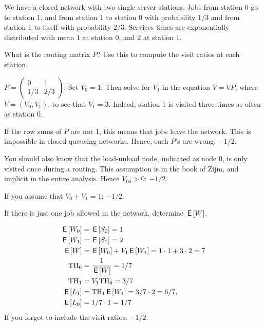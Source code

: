 We have a closed network with two single-server stations. Jobs from station 0 go to station 1, and from station 1 to station 0 with probability 1/3 and from station 1 to itself with probability $2/3$.  Services times are exponentially distributed with mean $1$ at station $0$, and $2$ at station 1.

\begin{exercise}[201804]
What is the routing matrix $P$? Use this to compute the visit ratios at each station.
\begin{solution}
  $P=
  \begin{pmatrix}
    0 & 1 \\
1/3 & 2/3
  \end{pmatrix}
$. Set $V_0=1$. Then solve for $V_1$ in the equation $V = VP$, where $V=(V_0, V_1)$, to see that $V_1=3$. Indeed, station 1 is visited three times as often as station 0. 

If the row sums of $P$ are not 1, this means that jobs leave the network. This is impossible in closed queueing networks. Hence, such $P$'s are wrong. $-1/2$.

You should also know that the load-unload node, indicated as node 0, is only visited once during a routing. This assumption is in the book of Zijm, and implicit in the entire analysis. Hence $V_{00}>0$: $-1/2$.

If you assume that $V_0+V_1=1$: $-1/2$. 

\end{solution}
\end{exercise}

\begin{exercise}[201804]
  If there is just one job allowed in the network, determine $\,\mathsf{E}\left[W\right]$.
\begin{solution}
    \begin{align*}
    \,\mathsf{E}\left[W_0\right] &= \,\mathsf{E}\left[S_0\right] = 1\\      
    \,\mathsf{E}\left[W_1\right] &= \,\mathsf{E}\left[S_1\right] = 2\\
\,\mathsf{E}\left[W\right] &= \,\mathsf{E}\left[W_0\right] + V_1 \,\mathsf{E}\left[W_1\right] = 1\cdot 1 + 3 \cdot 2 = 7\\
\mathrm{TH}_0 &= \frac{1}{\,\mathsf{E}\left[W\right]} = 1/7\\
\mathrm{TH}_1&= V_1 \mathrm{TH}_0 = 3/7\\
\,\mathsf{E}\left[L_1\right] &= \mathrm{TH}_1 \,\mathsf{E}\left[W_1\right] = 3/7\cdot 2 = 6/7,\\
\,\mathsf{E}\left[L_0\right] &= 1/7\cdot 1 = 1/7
    \end{align*}
If you forgot to include the visit ratios: $-1/2$. 
\end{solution}
\end{exercise}

